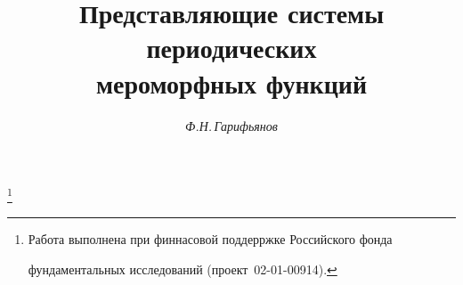 

 


 


\newcommand{\im}{\operatorname{Im}} 


\newcommand{\tg}{\operatorname{tg}} 


\newcommand{\ctg}{\operatorname{ctg}} 


\newcommand{\Int}{\operatorname{int}} 


\newcommand{\ext}{\operatorname{ext}} 


\newcommand{\tts}[1]{} 


 


 




\setcounter{page}{13} 












 


\author{\it Ф.Н.\,Гарифьянов} 




\title{Представляющие системы периодических \\ 


мероморфных функций} 


\thanks{Работа выполнена при финнасовой поддерржке Российского фонда


фундаментальных исследований (проект \No\,02-01-00914).}


 


\date{} 




\pagestyle{plain} %



